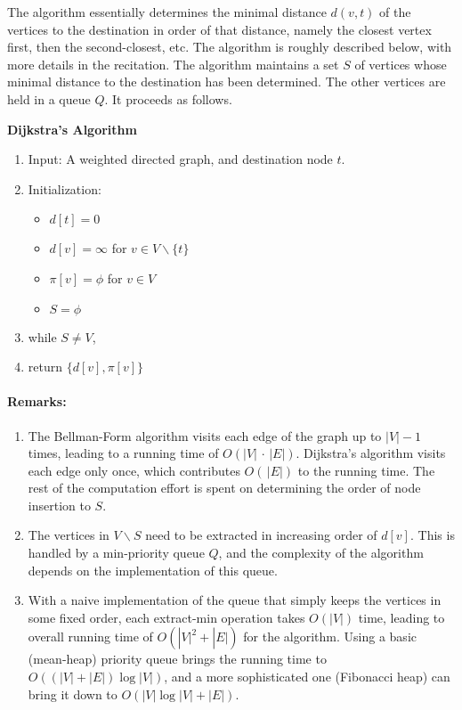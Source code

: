 The algorithm essentially determines the minimal distance $d(v,t)$ of the vertices to the destination in order of that distance, namely the closest vertex first, then the second-closest, etc.  The algorithm is roughly described below, with more details in the recitation.
The algorithm maintains a set $S$ of vertices whose minimal distance to the destination has been determined. The other vertices are held in a queue $Q$. It proceeds as follows.

\begin{algorithm_}\textbf{Dijkstra's Algorithm}
\begin{enumerate}
\item{Input:} A weighted directed graph, and destination node $t$.

\item Initialization:
\begin{itemize}
  \item[] $d[t] = 0$
  \item[] $d[v] = \infty $ for $v \in V\backslash \{ t\} $
  \item[] $\pi [v] = \phi $ for $v \in V$
  \item[] $S = \phi $
\end{itemize}

\item while $S \ne V$,




\item return $\{ d[v],\pi [v]\} $
\end{enumerate}
\end{algorithm_}

\paragraph{Remarks:}
\begin{enumerate}
  \item The Bellman-Form algorithm visits each edge of the graph up to $|V|-1$ times, leading to a running time of $O(|V|\, \cdot \,|E|)$. Dijkstra's algorithm visits each edge only once, which contributes $O(\,|E|)$ to the running time. The rest of the computation effort is spent on determining the order of node insertion to $S$.
  \item	The vertices in $V\backslash S$ need to be extracted in increasing order of $d[v]$.  This is handled by a min-priority queue $Q$, and the complexity of the algorithm depends on the implementation of this queue.
  \item	With a naive implementation of the queue that simply keeps the vertices in some fixed order, each extract-min operation takes  $O(|V|)$ time, leading to overall running time of $O(|V{|^2} + |E|)$ for the algorithm. Using a basic (mean-heap) priority queue brings the running time to $O((|V| + |E|)\log |V|)$, and a more sophisticated one (Fibonacci heap) can bring it down to  $O(|V|\log |V| + |E|)$.
\end{enumerate}

